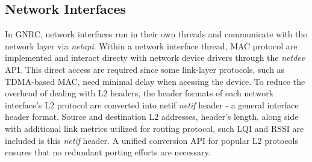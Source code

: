 \subsection{Network Interfaces}
  In GNRC, network interfaces run in their own threads and communicate with the network layer
  via \textit{netapi}. Within a network interface thread, MAC protocol are implemented
  and interact directy with network device drivers through the \textit{netdev} API. This direct
  access are required since some link-layer protocols, such as TDMA-based MAC, need minimal
  delay when acessing the device. To reduce the overhead of dealing with L2 headers, the header
  formats of each network interface's L2 protocol are converted into netif \textit{netif} header -
  a general interface header format. Source and destination L2 addresses, header's length, along side
  with additional link metrics utilized for routing protocol, such LQI and RSSI are included is this
  \textit{netif} header. A unified conversion API for popular L2 protocols ensures that 
  no redundant porting efforts are necessary.
